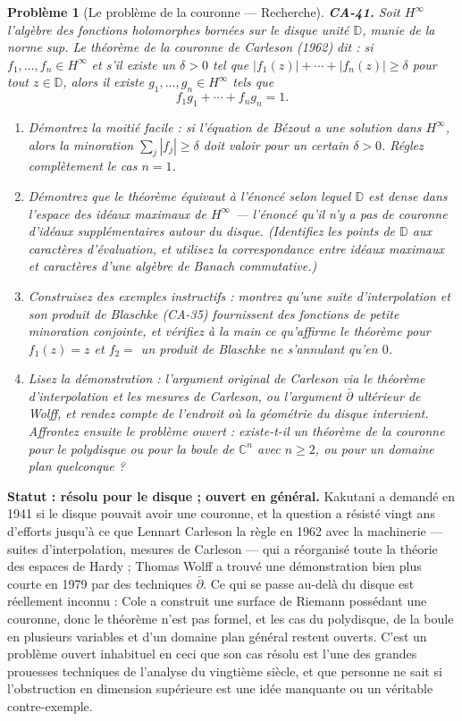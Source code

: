 \documentclass[11pt]{article}
\newtheorem{problem}{Problème}
\begin{document}
\begin{problem}[{Le problème de la couronne --- Recherche}]
\textbf{CA-41.} Soit $ H^{\infty} $ l'algèbre des fonctions holomorphes bornées sur le disque
unité $ \mathbb{D} $, munie de la norme sup. Le théorème de la couronne de Carleson (1962) dit :
si $ f_1, \dots, f_n \in H^{\infty} $ et s'il existe un $ \delta > 0 $ tel que
$ |f_1(z)| + \cdots + |f_n(z)| \ge \delta $ pour tout $ z \in \mathbb{D} $, alors il existe
$ g_1, \dots, g_n \in H^{\infty} $ tels que
\[ f_1 g_1 + \cdots + f_n g_n = 1 . \]
\begin{enumerate}
\item[(a)] Démontrez la moitié facile : si l'équation de Bézout a une solution dans $ H^{\infty} $, alors
la minoration $ \sum_j |f_j| \ge \delta $ doit valoir pour un certain $ \delta > 0 $. Réglez
complètement le cas $ n = 1 $.
\item[(b)] Démontrez que le théorème équivaut à l'énoncé selon lequel $ \mathbb{D} $ est dense dans
l'espace des idéaux maximaux de $ H^{\infty} $ --- l'énoncé qu'il n'y a pas de \og{} couronne \fg{} d'idéaux
supplémentaires autour du disque. (Identifiez les points de $ \mathbb{D} $ aux caractères
d'évaluation, et utilisez la correspondance entre idéaux maximaux et caractères d'une algèbre de
Banach commutative.)
\item[(c)] Construisez des exemples instructifs : montrez qu'une suite d'interpolation et son produit de
Blaschke (CA-35) fournissent des fonctions de petite minoration conjointe, et vérifiez à la main ce
qu'affirme le théorème pour $ f_1(z) = z $ et $ f_2 = $ un produit de Blaschke ne s'annulant
qu'en $ 0 $.
\item[(d)] Lisez la démonstration : l'argument original de Carleson via le théorème d'interpolation et les
mesures de Carleson, ou l'argument $ \bar\partial $ ultérieur de Wolff, et rendez compte de
l'endroit où la géométrie du disque intervient. Affrontez ensuite le problème ouvert : existe-t-il
un théorème de la couronne pour le polydisque ou pour la boule de $ \mathbb{C}^n $ avec
$ n \ge 2 $, ou pour un domaine plan quelconque ?
\end{enumerate}

\end{problem}

\noindent \textbf{Statut : résolu pour le disque ; ouvert en général.} Kakutani a demandé en
1941 si le disque pouvait avoir une couronne, et la question a résisté vingt ans d'efforts jusqu'à
ce que Lennart Carleson la règle en 1962 avec la machinerie --- suites d'interpolation, mesures de
Carleson --- qui a réorganisé toute la théorie des espaces de Hardy ; Thomas Wolff a trouvé une
démonstration bien plus courte en 1979 par des techniques $ \bar\partial $. Ce qui se passe au-delà
du disque est réellement inconnu : Cole a construit une surface de Riemann possédant une couronne,
donc le théorème n'est pas formel, et les cas du polydisque, de la boule en plusieurs variables et
d'un domaine plan général restent ouverts. C'est un problème ouvert inhabituel en ceci que son cas
résolu est l'une des grandes prouesses techniques de l'analyse du vingtième siècle, et que personne
ne sait si l'obstruction en dimension supérieure est une idée manquante ou un véritable
contre-exemple.
\end{document}
